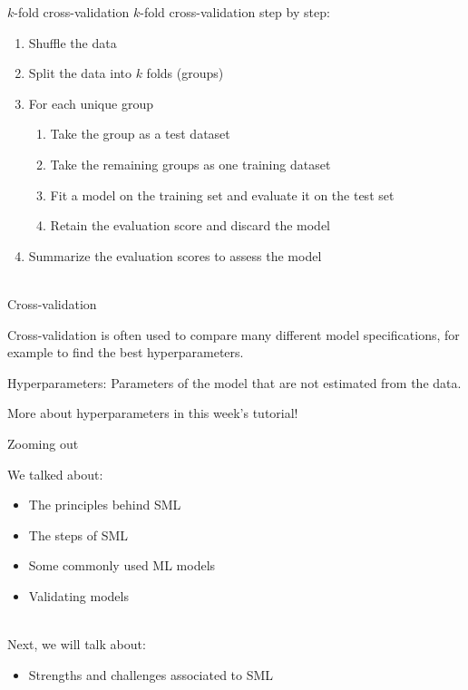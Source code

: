 \documentclass[handout]{beamer}
\begin{document}
\begin{frame}{\(k\)-fold cross-validation}
	\(k\)-fold cross-validation step by step:
	\begin{enumerate}
		\item Shuffle the data
		\item Split the data into \(k\) folds (groups)
		\item For each unique group
		\begin{enumerate}
			\item Take the group as a test dataset
			\item Take the remaining groups as one training dataset
			\item Fit a model on the training set and evaluate it on the test set
			\item Retain the evaluation score and discard the model
		\end{enumerate}
		\item Summarize the evaluation scores to assess the model \\\
	\end{enumerate}

\end{frame}
	

\begin{frame}{Cross-validation}
	
	Cross-validation is often used to compare many different model specifications, for example to find the best hyperparameters.
	
	Hyperparameters: Parameters of the model that are not estimated from the data. \\
	\cite{van_atteveldt_computational_2022}
	
	More about hyperparameters in this week's tutorial!
	
\end{frame}




\begin{frame}{Zooming out} 
	
	We talked about:
	\begin{itemize}
		\item The principles behind SML
		\item The steps of SML
		\item Some commonly used ML models
		\item Validating models \\\
	\end{itemize}
	
	Next, we will talk about:
	\begin{itemize}
		\item Strengths and challenges associated to SML
	\end{itemize}
	
\end{frame}
\end{document}
